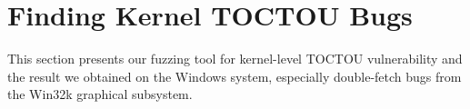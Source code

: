 \section{Finding Kernel TOCTOU Bugs}
\label{sec:ktoctou-experiment}





This section presents our fuzzing tool for kernel-level TOCTOU vulnerability and the result we obtained on the Windows system, especially double-fetch bugs from the Win32k graphical subsystem.


